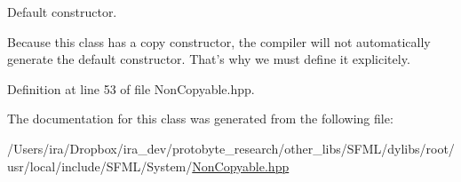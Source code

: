 Default constructor. 

Because this class has a copy constructor, the compiler will not automatically generate the default constructor. That's why we must define it explicitely. 

Definition at line 53 of file Non\-Copyable.\-hpp.



The documentation for this class was generated from the following file\-:\begin{DoxyCompactItemize}
\item 
/\-Users/ira/\-Dropbox/ira\-\_\-dev/protobyte\-\_\-research/other\-\_\-libs/\-S\-F\-M\-L/dylibs/root/usr/local/include/\-S\-F\-M\-L/\-System/\hyperlink{_non_copyable_8hpp}{Non\-Copyable.\-hpp}\end{DoxyCompactItemize}
